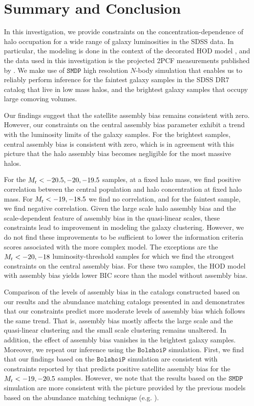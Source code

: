 \documentclass[12pt, preprint]{aastex}
\begin{document}
\section{Summary and Conclusion}\label{sec:summary}

In this investigation, we provide constraints on the concentration-dependence of halo occupation for a wide range of galaxy luminosities in the SDSS data. In particular, the modeling is done in the context of the decorated HOD model \citet{decorated}, and the data used in this investigation is the projected 2PCF measurements published by \citet{guo2015}. We make use of $\mathtt{SMDP}$ high resolution $N$-body simulation that enables us to reliably perform inference for the faintest galaxy samples in the SDSS DR7 catalog that live in low mass halos, and the brightest galaxy samples that occupy large comoving volumes. 

Our findings suggest that the satellite assembly bias remains consistent with zero. However, our constraints on the central assembly bias parameter exhibit a trend with the luminosity limits of the galaxy samples. For the brightest samples, central assembly bias is consistent with zero, which is in agreement with this picture that the halo assembly bias becomes negligible for the most massive halos. 

For the $M_{\rm r}<-20.5, -20, -19.5$ samples, at a fixed halo mass, we find positive correlation between the central population and halo concentration at fixed halo mass. For $M_{\rm r}<-19, -18.5$ we find no correlation, and for the faintest sample, we find negative correlation. Given the large scale halo assembly bias and the scale-dependent feature of assembly bias in the quasi-linear scales, these constraints lead to improvement in modeling the galaxy clustering. However, we do not find these improvements to be sufficient to lower the information criteria scores associated with the more complex model. The exceptions are the $M_{\rm r}<-20,-18$ luminosity-threshold samples for which we find the strongest constraints on the central assembly bias. For these two samples, the HOD model with assembly bias yields lower BIC score than the model without assembly bias.

Comparison of the levels of assembly bias in the catalogs constructed based on our results and the abundance matching catalogs presented in \citet{hw2013,arz2014} and \citet{edHOD-weinberg} demonstrates that our constraints predict more moderate levels of assembly bias which follows the same trend. That is, assembly bias mostly affects the large scale and the quasi-linear clustering and the small scale clustering remains unaltered. In addition, the effect of assembly bias vanishes in the brightest galaxy samples. Moreover, we repeat our inference using the $\mathtt{BolshoiP}$ simulation. First, we find that our findings based on the $\mathtt{BolshoiP}$ simulation are consistent with constraints reported by \citet{zentner2016} that predicts positive satellite assembly bias for the $M_{\rm r}<-19, -20.5$ samples. However, we note that the results based on the $\mathtt{SMDP}$ simulation are more consistent with the picture provided by the previous models based on the abundance matching technique (e.g. \citealt{arz2014,lehman2015}). 
\end{document}
